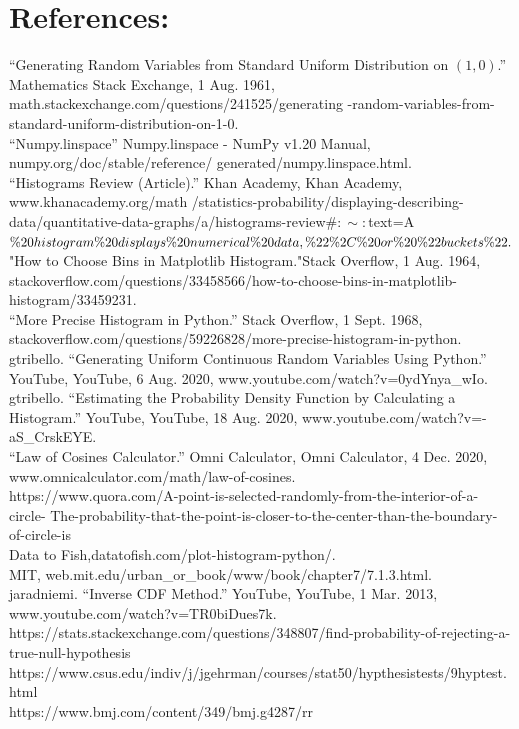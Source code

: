 \documentclass[answers]{exam}
\begin{document}
\section{References:}
\begin{framed}
\begin{thebibliography}{9}
“Generating Random Variables from Standard Uniform Distribution on $(1,0)$.” Mathematics Stack Exchange, 1 Aug. 1961, math.stackexchange.com/questions/241525/generating
-random-variables-from-standard-uniform-distribution-on-1-0. \\ 
“Numpy.linspace” Numpy.linspace - NumPy v1.20 Manual, numpy.org/doc/stable/reference/
generated/numpy.linspace.html.\\ 
“Histograms Review (Article).” Khan Academy, Khan Academy, www.khanacademy.org/math
/statistics-probability/displaying-describing-data/quantitative-data-graphs/a/histograms-review$\#:\sim:$text=A$\%20histogram\%20displays\%20numerical\%20data,\%22\%2C\%20or\%20\%22buckets\\\%22.$ \\
"How to Choose Bins in Matplotlib Histogram."Stack Overflow, 1 Aug. 1964, stackoverflow.com/questions/33458566/how-to-choose-bins-in-matplotlib-histogram/33459231.\\
“More Precise Histogram in Python.” Stack Overflow, 1 Sept. 1968, stackoverflow.com/questions/59226828/more-precise-histogram-in-python.\\
gtribello. “Generating Uniform Continuous Random Variables Using Python.” YouTube, YouTube, 6 Aug. 2020, www.youtube.com/watch?v=0ydYnya\_wIo.\\
gtribello. “Estimating the Probability Density Function by Calculating a Histogram.” YouTube, YouTube, 18 Aug. 2020, www.youtube.com/watch?v=-aS\_CrskEYE.\\
“Law of Cosines Calculator.” Omni Calculator, Omni Calculator, 4 Dec. 2020, www.omnicalculator.com/math/law-of-cosines. \\
https://www.quora.com/A-point-is-selected-randomly-from-the-interior-of-a-circle-
The-probability-that-the-point-is-closer-to-the-center-than-the-boundary-of-circle-is\\
Data to Fish,datatofish.com/plot-histogram-python/. \\
MIT, web.mit.edu/urban\_or\_book/www/book/chapter7/7.1.3.html.\\
jaradniemi. “Inverse CDF Method.” YouTube, YouTube, 1 Mar. 2013, www.youtube.com/watch?v=TR0biDues7k.\\
 https://stats.stackexchange.com/questions/348807/find-probability-of-rejecting-a-true-null-hypothesis\\
 https://www.csus.edu/indiv/j/jgehrman/courses/stat50/hypthesistests/9hyptest.html \\
https://www.bmj.com/content/349/bmj.g4287/rr
\end{thebibliography}
\end{framed}
\end{document}
